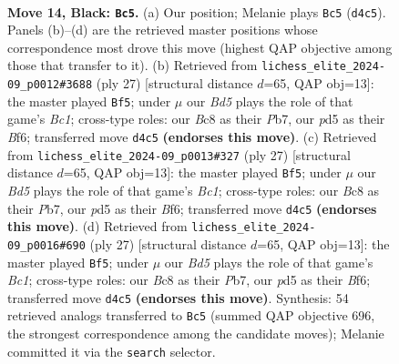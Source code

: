 \documentclass[11pt]{article}
\begin{document}
\clearpage

\begin{figure}[p]\centering
\begin{subfigure}{0.46\textwidth}\centering
\resizebox{\linewidth}{!}{%
\newchessgame
\chessboard[
  setfen={r1bqn1k1/pppp1ppp/8/3P4/3b4/2N4P/PPP2PP1/R1B1QBK1 b - - 0 14},
  showmover=false,
  pgfstyle=straightmove, color=movearrow, markmove={d4-c5}
]}
\caption{}
\end{subfigure}\hfill
\begin{subfigure}{0.46\textwidth}\centering
\resizebox{\linewidth}{!}{%
\newchessgame
\chessboard[
  setfen={r1bqn1k1/ppp2ppp/5b2/3p4/3P1B2/2P5/PP1N1PPP/R3QBK1 b - - 1 14},
  showmover=false,
  pgfstyle=straightmove, color=movearrow, markmove={c8-f5}
]}
\caption{}
\end{subfigure}
\\[4pt]
\begin{subfigure}{0.46\textwidth}\centering
\resizebox{\linewidth}{!}{%
\newchessgame
\chessboard[
  setfen={r1bqn1k1/ppp2ppp/5b2/3p4/3P1B2/2P5/PP1N1PPP/R3QBK1 b - - 1 14},
  showmover=false,
  pgfstyle=straightmove, color=movearrow, markmove={c8-f5}
]}
\caption{}
\end{subfigure}\hfill
\begin{subfigure}{0.46\textwidth}\centering
\resizebox{\linewidth}{!}{%
\newchessgame
\chessboard[
  setfen={r1bqn1k1/ppp2ppp/5b2/3p4/3P1B2/2P5/PP1N1PPP/R3QBK1 b - - 1 14},
  showmover=false,
  pgfstyle=straightmove, color=movearrow, markmove={c8-f5}
]}
\caption{}
\end{subfigure}
\caption{\textbf{Move 14, Black: \texttt{Bc5}.} (a) Our position; Melanie plays \texttt{Bc5} (\texttt{d4c5}). Panels (b)--(d) are the retrieved master positions whose correspondence most drove this move (highest QAP objective among those that transfer to it). (b) Retrieved from \texttt{lichess\_elite\_2024-09\_p0012\#3688} (ply 27) [structural distance $d$=65, QAP obj=13]: the master played \texttt{Bf5}; under $\mu$ our \emph{Bd5} plays the role of that game's \emph{Bc1}; cross-type roles: our \emph{B}c8 as their \emph{P}b7, our \emph{p}d5 as their \emph{B}f6; transferred move \texttt{d4c5} \textbf{(endorses this move)}. (c) Retrieved from \texttt{lichess\_elite\_2024-09\_p0013\#327} (ply 27) [structural distance $d$=65, QAP obj=13]: the master played \texttt{Bf5}; under $\mu$ our \emph{Bd5} plays the role of that game's \emph{Bc1}; cross-type roles: our \emph{B}c8 as their \emph{P}b7, our \emph{p}d5 as their \emph{B}f6; transferred move \texttt{d4c5} \textbf{(endorses this move)}. (d) Retrieved from \texttt{lichess\_elite\_2024-09\_p0016\#690} (ply 27) [structural distance $d$=65, QAP obj=13]: the master played \texttt{Bf5}; under $\mu$ our \emph{Bd5} plays the role of that game's \emph{Bc1}; cross-type roles: our \emph{B}c8 as their \emph{P}b7, our \emph{p}d5 as their \emph{B}f6; transferred move \texttt{d4c5} \textbf{(endorses this move)}. Synthesis: 54 retrieved analogs transferred to \texttt{Bc5} (summed QAP objective 696, the strongest correspondence among the candidate moves); Melanie committed it via the \texttt{search} selector.}
\label{fig:thought-m27}
\end{figure}
\end{document}
